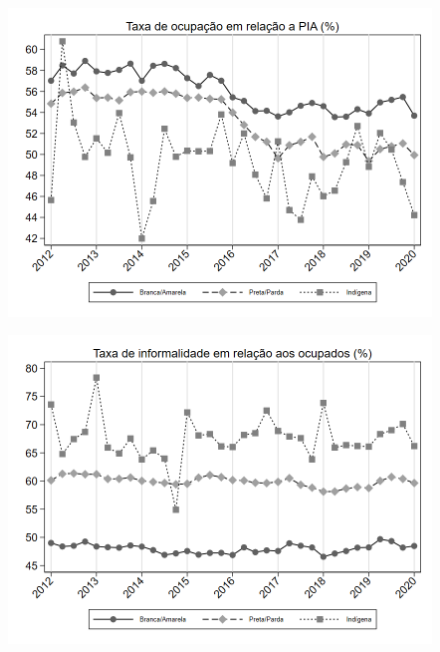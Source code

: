 \begin{frame}[label=_composicao_demografica_raca_taxa_de_ocupacao]{}
\textit{\hyperlink{_composicao_demografica_raca}{}}
\begin{figure}
  \centering
  \includegraphics[width=1\linewidth]{../../analysis/output/composicao_demografica/raca/_composicao_demografica_raca_taxa_de_ocupacao.png}
  \caption{}
  \label{fig:_composicao_demografica_raca_taxa_de_ocupacao}
\end{figure}
\end{frame}

\begin{frame}[label=_composicao_demografica_raca_taxa_de_informalidade]{}
\textit{\hyperlink{_composicao_demografica_raca}{}}
\begin{figure}
  \centering
  \includegraphics[width=1.0\linewidth]{../../analysis/output/composicao_demografica/raca/_composicao_demografica_raca_taxa_de_informalidade.png}
  \caption{}
  \label{fig:_composicao_demografica_raca_taxa_de_informalidade}
\end{figure}
\end{frame}

